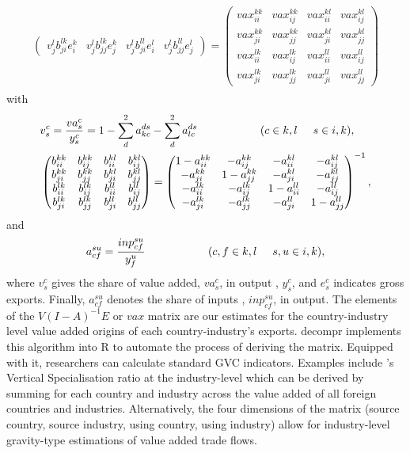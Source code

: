 \documentclass{article}\usepackage[]{graphicx}\usepackage[]{color}
\begin{document}
\begin{align}
\begin{split}
\begin{pmatrix}
v_{j}^{l}b_{ji}^{lk}e_{i}^{k}& v_{j}^{l}b_{jj}^{lk}e_{j}^{k}& v_{j}^{l}b_{ji}^{ll}e_{i}^{l}& v_{j}^{l}b_{jj}^{ll}e_{j}^{l}
\end{pmatrix}
=
\begin{pmatrix}
vax_{ii}^{kk}& vax_{ij}^{kk}& vax_{ii}^{kl}& vax_{ij}^{kl}\\
vax_{ji}^{kk}& vax_{jj}^{kk}& vax_{ji}^{kl}& vax_{jj}^{kl}\\
vax_{ii}^{lk}& vax_{ij}^{lk}& vax_{ii}^{ll}& vax_{ij}^{ll}\\
vax_{ji}^{lk}& vax_{jj}^{lk}& vax_{ji}^{ll}& vax_{jj}^{ll}
\end{pmatrix}
\end{split}
\end{align}
with
\begin{align*}
&v_{s}^{c} = \frac{va_{s}^{c}}{y_{s}^{c}} = 1 - \sum_{d}^{2}{a_{kc}^{ds}} - \sum_{d}^{2}{a_{lc}^{ds}} \hspace{2cm} (c \in k,l \hspace{.5cm} s \in i,k),\\
&\begin{pmatrix}
b_{ii}^{kk}& b_{ij}^{kk}& b_{ii}^{kl}& b_{ij}^{kl}\\
b_{ji}^{kk}& b_{jj}^{kk}& b_{ji}^{kl}& b_{jj}^{kl}\\
b_{ii}^{lk}& b_{ij}^{lk}& b_{ii}^{ll}& b_{ij}^{ll}\\
b_{ji}^{lk}& b_{jj}^{lk}& b_{ji}^{ll}& b_{jj}^{ll}
\end{pmatrix}
=
\begin{pmatrix}
1-a_{ii}^{kk}& -a_{ij}^{kk}& -a_{ii}^{kl}& -a_{ij}^{kl}\\
-a_{ji}^{kk}& 1-a_{jj}^{kk}& -a_{ji}^{kl}& -a_{jj}^{kl}\\
-a_{ii}^{lk}& -a_{ij}^{lk}& 1-a_{ii}^{ll}& -a_{ij}^{ll}\\
-a_{ji}^{lk}& -a_{jj}^{lk}& -a_{ji}^{ll}& 1-a_{jj}^{ll}
\end{pmatrix}^{-1},
\end{align*}
and
\begin{equation*}
a_{cf}^{su} = \frac{inp_{cf}^{su}}{y_{f}^{u}}  \hspace{2cm} (c,f \in k,l \hspace{.5cm} s,u \in i,k),
\end{equation*}
where $v_{s}^{c}$ gives the share of value added, $va_{s}^{c}$, in output , $y_{s}^{c}$, and $e_{s}^{c}$ indicates gross exports. Finally, $a_{cf}^{su}$ denotes the share of inputs , $inp_{cf}^{su}$, in output. The elements of the $V(I-A)^{-1}E$ or $vax$ matrix are our estimates for the country-industry level value added origins of each country-industry's exports. decompr implements this algorithm into R to automate the process of deriving the matrix. Equipped with it, researchers can calculate standard GVC indicators. Examples include \citet{dahuetal01}'s Vertical Specialisation ratio at the industry-level which can be derived by summing for each country and industry across the value added of all foreign countries and industries. Alternatively, the four dimensions of the matrix (source country, source industry, using country, using industry) allow for industry-level gravity-type estimations of value added trade flows.
\end{document}
